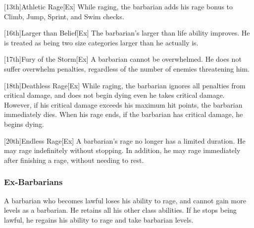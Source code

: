         [13th]{Athletic Rage}[Ex]
        While raging, the barbarian adds his rage bonus to Climb, Jump, Sprint, and Swim checks.

        [16th]{Larger than Belief}[Ex]
        The barbarian's larger than life ability improves.
        He is treated as being two size categories larger than he actually is.

        [17th]{Fury of the Storm}[Ex]
        A barbarian cannot be overwhelmed.
        He does not suffer overwhelm penalties, regardless of the number of enemies threatening him.

        [18th]{Deathless Rage}[Ex]
        While raging, the barbarian ignores all penalties from critical damage, and does not begin dying even he takes critical damage.
        However, if his critical damage exceeds his maximum hit points, the barbarian immediately dies.
        When his rage ends, if the barbarian has critical damage, he begins dying.

        [20th]{Endless Rage}[Ex]
        A barbarian's rage no longer has a limited duration.
        He may rage indefinitely without stopping.
        In addition, he may rage immediately after finishing a rage, without needing to rest.

        \subsubsection{Ex-Barbarians}
            A barbarian who becomes lawful loses his ability to rage, and cannot gain more levels as a barbarian.
            He retains all his other class abilities.
            If he stops being lawful, he regains his ability to rage and take barbarian levels.

